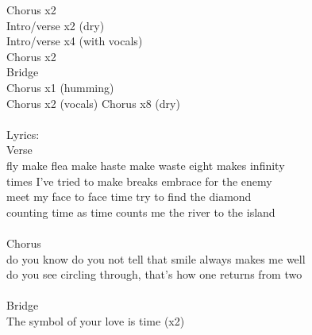{Chorus x2\\
Intro/verse x2 (dry)\\
Intro/verse x4 (with vocals)\\
Chorus x2\\
Bridge\\
Chorus x1 (humming)\\
Chorus x2 (vocals)
Chorus x8 (dry)
\\
\\
Lyrics:\\
\lbrack Verse \rbrack\\
fly make flea make haste make waste eight makes infinity\\
times I've tried to make breaks embrace for the enemy\\
meet my face to face time try to find the diamond\\
counting time as time counts me the river to the island\\
\\
\lbrack Chorus \rbrack\\
do you know do you not tell that smile always makes me well\\
do you see circling through, that's how one returns from two\\
\\
\lbrack Bridge \rbrack\\
The symbol of your love is time (x2)}
